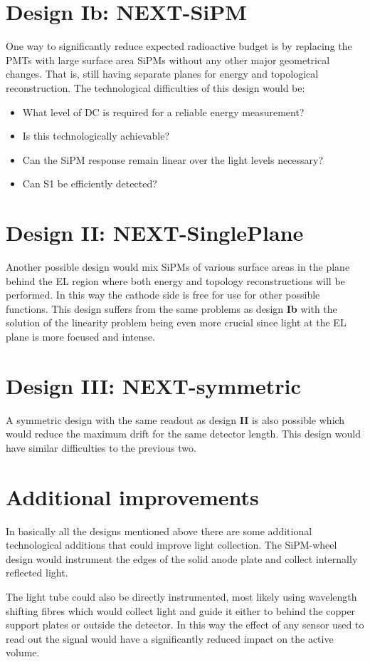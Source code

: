 \documentclass[11pt,a4paper]{article}
\begin{document}
\section{Design Ib: NEXT-SiPM}
One way to significantly reduce expected radioactive budget is by replacing the PMTs with large surface area SiPMs without any other major geometrical changes. That is, still having separate planes for energy and topological reconstruction. The technological difficulties of this design would be:
\begin{itemize}
\item What level of DC is required for a reliable energy measurement?
\item Is this technologically achievable?
\item Can the SiPM response remain linear over the light levels necessary?
\item Can S1 be efficiently detected?
\end{itemize}

\section{Design II: NEXT-SinglePlane}
Another possible design would mix SiPMs of various surface areas in the plane behind the EL region where both energy and topology reconstructions will be performed. In this way the cathode side is free for use for other possible functions. This design suffers from the same problems as design {\bf Ib} with the solution of the linearity problem being even more crucial since light at the EL plane is more focused and intense.

\section{Design III: NEXT-symmetric}
A symmetric design with the same readout as design {\bf II} is also possible which would reduce the maximum drift for the same detector length. This design would have similar difficulties to the previous two.

\section{Additional improvements}
In basically all the designs mentioned above there are some additional technological additions that could improve light collection. The SiPM-wheel design would instrument the edges of the solid anode plate and collect internally reflected light.

The light tube could also be directly instrumented, most likely using wavelength shifting fibres which would collect light and guide it either to behind the copper support plates or outside the detector. In this way the effect of any sensor used to read out the signal would have a significantly reduced impact on the active volume.




\end{document}
